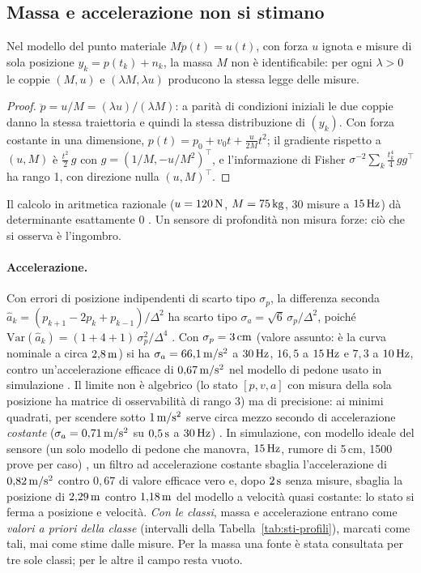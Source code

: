\subsection{Massa e accelerazione non si stimano}\label{sec:sti-massa}

\begin{proposizione}\label{prop:sti-massa}
Nel modello del punto materiale $M\ddot p(t)=u(t)$, con forza $u$ ignota e misure di sola posizione $y_k=p(t_k)+n_k$, la massa $M$ non è identificabile: per ogni $\lambda>0$ le coppie $(M,u)$ e $(\lambda M,\lambda u)$ producono la stessa legge delle misure. 
\end{proposizione}
\begin{proof}
$\ddot p=u/M=(\lambda u)/(\lambda M)$: a parità di condizioni iniziali le due coppie danno la stessa traiettoria e quindi la stessa distribuzione di $(y_k)$. Con forza costante in una dimensione, $p(t)=p_0+v_0t+\tfrac{u}{2M}t^2$; il gradiente rispetto a $(u,M)$ è $\tfrac{t^2}{2}\,g$ con $g=(1/M,-u/M^2)^{\top}$, e l'informazione di Fisher $\sigma^{-2}\sum_k\tfrac{t_k^4}{4}\,gg^{\top}$ ha rango 1, con direzione nulla $(u,M)^{\top}$.
\end{proof}
Il calcolo in aritmetica razionale ($u=120\,\mathrm{N}$, $M=75\,\mathrm{kg}$, 30 misure a $15\,\mathrm{Hz}$) dà determinante esattamente 0 . Un sensore di profondità non misura forze: ciò che si osserva è l'ingombro.

\paragraph{Accelerazione.} Con errori di posizione indipendenti di scarto tipo $\sigma_p$, la differenza seconda $\hat a_k=(p_{k+1}-2p_k+p_{k-1})/\Delta^2$ ha scarto tipo $\sigma_a=\sqrt6\,\sigma_p/\Delta^2$, poiché $\mathrm{Var}(\hat a_k)=(1+4+1)\,\sigma_p^2/\Delta^4$ . Con $\sigma_p=3\,\mathrm{cm}$ (valore assunto: è la curva nominale a circa $2{,}8\,\mathrm{m}$) si ha $\sigma_a=66{,}1\,\mathrm{m/s^2}$ a $30\,\mathrm{Hz}$, $16{,}5$ a $15\,\mathrm{Hz}$ e $7{,}3$ a $10\,\mathrm{Hz}$, contro un'accelerazione efficace di $0{,}67\,\mathrm{m/s^2}$ nel modello di pedone usato in simulazione . Il limite non è algebrico (lo stato $[p,v,a]$ con misura della sola posizione ha matrice di osservabilità di rango 3) ma di precisione: ai minimi quadrati, per scendere sotto $1\,\mathrm{m/s^2}$ serve circa mezzo secondo di accelerazione \emph{costante} ($\sigma_a=0{,}71\,\mathrm{m/s^2}$ su $0{,}5\,\mathrm{s}$ a $30\,\mathrm{Hz}$) . In simulazione, con modello ideale del sensore (un solo modello di pedone che manovra, $15\,\mathrm{Hz}$, rumore di 5\,cm, 1500 prove per caso) , un filtro ad accelerazione costante sbaglia l'accelerazione di $0{,}82\,\mathrm{m/s^2}$ contro $0{,}67$ di valore efficace vero e, dopo $2\,\mathrm{s}$ senza misure, sbaglia la posizione di $2{,}29\,\mathrm{m}$ contro $1{,}18\,\mathrm{m}$ del modello a velocità quasi costante: lo stato si ferma a posizione e velocità. \emph{Con le classi}, massa e accelerazione entrano come \emph{valori a priori della classe} (intervalli della Tabella~\ref{tab:sti-profili}), marcati come tali, mai come stime dalle misure. Per la massa una fonte è stata consultata per tre sole classi; per le altre il campo resta vuoto.

